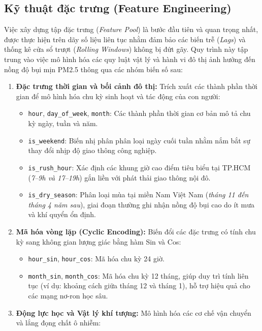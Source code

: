 \subsection{Kỹ thuật đặc trưng (Feature Engineering)}
Việc xây dựng tập đặc trưng (\textit{Feature Pool}) là bước đầu tiên và quan trọng nhất, được thực hiện trên dãy số liệu liên tục nhằm đảm bảo các biến trễ (\textit{Lags}) và thống kê cửa sổ trượt (\textit{Rolling Windows}) không bị đứt gãy. Quy trình này tập trung vào việc mô hình hóa các quy luật vật lý và hành vi đô thị ảnh hưởng đến nồng độ bụi mịn PM2.5 thông qua các nhóm biến số sau:
\begin{enumerate}
    \item \textbf{Đặc trưng thời gian và bối cảnh đô thị:} Trích xuất các thành phần thời gian để mô hình hóa chu kỳ sinh hoạt và tác động của con người:
    \begin{itemize}
        \item \texttt{hour}, \texttt{day\_of\_week}, \texttt{month}: Các thành phần thời gian cơ bản mô tả chu kỳ ngày, tuần và năm.
        \item \texttt{is\_weekend}: Biến nhị phân phân loại ngày cuối tuần nhằm nắm bắt sự thay đổi nhịp độ giao thông công nghiệp.
        \item \texttt{is\_rush\_hour}: Xác định các khung giờ cao điểm tiêu biểu tại TP.HCM (\textit{7--9h và 17--19h}) gắn liền với phát thải giao thông nội đô.
        \item \texttt{is\_dry\_season}: Phân loại mùa tại miền Nam Việt Nam (\textit{tháng 11 đến tháng 4 năm sau}), giai đoạn thường ghi nhận nồng độ bụi cao do ít mưa và khí quyển ổn định.
    \end{itemize}
    \item \textbf{Mã hóa vòng lặp (Cyclic Encoding):} Biến đổi các đặc trưng có tính chu kỳ sang không gian lượng giác bằng hàm Sin và Cos:
    \begin{itemize}
        \item \texttt{hour\_sin}, \texttt{hour\_cos}: Mã hóa chu kỳ 24 giờ.
        \item \texttt{month\_sin}, \texttt{month\_cos}: Mã hóa chu kỳ 12 tháng, giúp duy trì tính liên tục (ví dụ: khoảng cách giữa tháng 12 và tháng 1), hỗ trợ hiệu quả cho các mạng nơ-ron học sâu.
    \end{itemize}
    \item \textbf{Động lực học và Vật lý khí tượng:} Mô hình hóa các cơ chế vận chuyển và lắng đọng chất ô nhiễm:
    \begin{itemize}

\end{itemize}
\end{enumerate}
